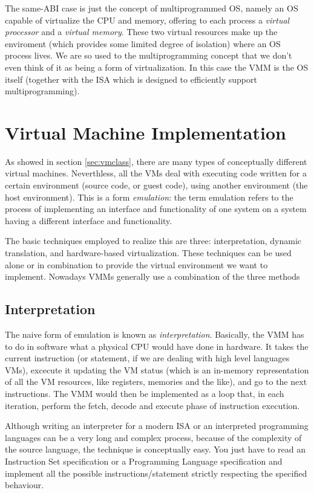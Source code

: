 The same-ABI case is just the concept of multiprogrammed OS, namely an OS capable of virtualize the CPU and
memory, offering to each process a \emph{virtual processor} and a \emph{virtual memory}. These two virtual resources make up
the enviroment (which provides some limited degree of isolation) where an OS process lives. We are so used to the multiprogramming
concept that we don't even think of it as being a form of virtualization. In this case the VMM is the OS itself (together with
the ISA which is designed to efficiently support multiprogramming).


\section{Virtual Machine Implementation}
\label{sec:vmimpl}

As showed in section \ref{sec:vmclass}, there are many types of conceptually different virtual machines.
Neverthless, all the VMs deal with executing code written for a certain environment (source code, or guest code),
using another environment (the host environment). This is a form \emph{emulation}: the term emulation refers to the process of implementing an interface 
and functionality of one system on a system having a different interface and functionality. %

The basic techniques employed to realize this are three: interpretation, dynamic translation, and hardware-based virtualization.
These techniques can be used alone or in combination to provide the virtual environment we want to implement.
Nowadays VMMs generally use a combination of the three methods


\subsection{Interpretation}
The naive form of emulation is known as \emph{interpretation}.
Basically, the VMM has to do in software what a physical CPU would have done
in hardware. It takes the current instruction (or statement, if we are dealing with high level languages VMs), excecute it updating the
VM status (which is an in-memory representation of all the VM resources, like registers, memories and the like), and go to the next
instructions. The VMM would then be implemented as a loop that, in each iteration, perform the fetch, decode and execute phase of
instruction execution.

Although writing an interpreter for a modern ISA or an interpreted programming languages can be a very long and complex process,
because of the complexity of the source language, the technique is conceptually easy. You just have to read an Instruction Set 
specification or a Programming Language specification and implement all the possible instructions/statement strictly respecting
the specified behaviour.

